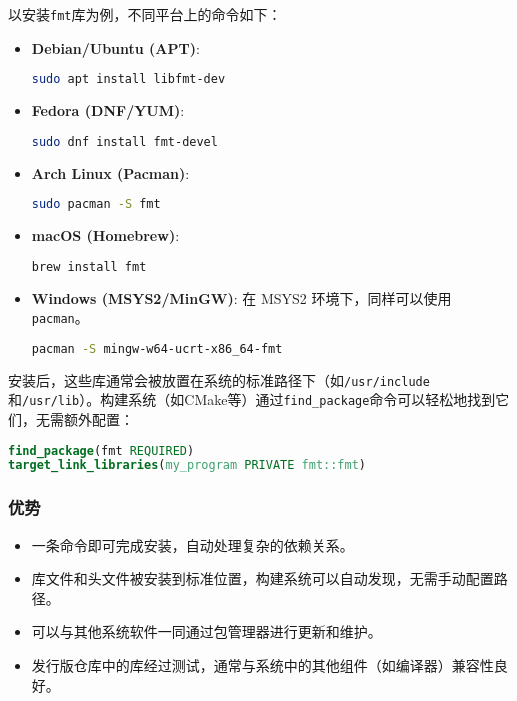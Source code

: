 \documentclass[../main]{subfiles}
\begin{document}
以安装\texttt{fmt}库为例，不同平台上的命令如下：

\begin{itemize}
    \item \textbf{Debian/Ubuntu (APT)}:
    \begin{lstlisting}[language=bash]
sudo apt install libfmt-dev
    \end{lstlisting}
    \item \textbf{Fedora (DNF/YUM)}:
    \begin{lstlisting}[language=bash]
sudo dnf install fmt-devel
    \end{lstlisting}
    \item \textbf{Arch Linux (Pacman)}:
    \begin{lstlisting}[language=bash]
sudo pacman -S fmt
    \end{lstlisting}
    \item \textbf{macOS (Homebrew)}:
    \begin{lstlisting}[language=bash]
brew install fmt
    \end{lstlisting}
    \item \textbf{Windows (MSYS2/MinGW)}: 在 MSYS2 环境下，同样可以使用 \texttt{pacman}。
    \begin{lstlisting}[language=bash]
pacman -S mingw-w64-ucrt-x86_64-fmt
    \end{lstlisting}
\end{itemize}

安装后，这些库通常会被放置在系统的标准路径下（如\texttt{/usr/include}和\texttt{/usr/lib}）。构建系统（如CMake等）通过\texttt{find\_package}命令可以轻松地找到它们，无需额外配置：
\begin{lstlisting}[language=cmake]
find_package(fmt REQUIRED)
target_link_libraries(my_program PRIVATE fmt::fmt)
\end{lstlisting}

\subsubsection{优势}
\begin{itemize}
    \item 一条命令即可完成安装，自动处理复杂的依赖关系。
    \item 库文件和头文件被安装到标准位置，构建系统可以自动发现，无需手动配置路径。
    \item 可以与其他系统软件一同通过包管理器进行更新和维护。
    \item 发行版仓库中的库经过测试，通常与系统中的其他组件（如编译器）兼容性良好。
\end{itemize}
\end{document}
